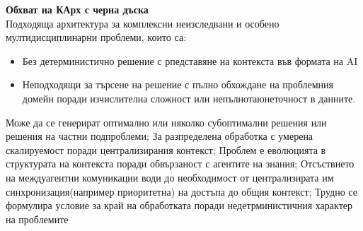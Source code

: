 \documentclass[11pt]{article} %
\begin{document}
\textbf{Обхват на КАрх с черна дъска}\\
Подходяща архитектура за комплексни неизследвани и особено мултидисциплинарни проблеми, които са:
\begin{itemize}[noitemsep]
	\item Без детерминистично решение с рпедставяне на контекста във формата на AI
	\item Неподходящи за търсене на решение с пълно обхождане на проблемния домейн поради изчислителна сложност или непълнотаюнеточност в данните.
\end{itemize}
Може да се генерират оптимално или няколко субоптимални решения или решения на частни подпроблеми; За разпределена обработка с умерена скалируемост поради централизирания контекст; Проблем е еволюцията в структурата на контекста поради обвързаност с агентите на знания; Отсъствието на междуагентни комуникации води до необходимост от централизирата им синхронизация(например приоритетна) на достъпа до общия контекст; Трудно се формулира условие за край на обработката поради недетрминистичния характер на проблемите
\end{document}
